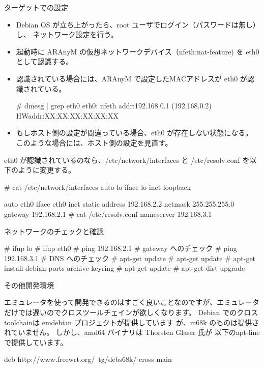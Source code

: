 \begin{frame}[containsverbatim]{ターゲットでの設定}

\begin{itemize}
\item Debian OS が立ち上がったら、root ユーザでログイン（パスワードは無し）し、
ネットワーク設定を行う。
\item 起動時に ARAnyM の仮想ネットワークデバイス（nfeth:nat-feature) を
eth0 として認識する。
\item 認識されている場合には、ARAnyM で設定したMACアドレスが eth0 が認識されている。

\begin{commandline}
# dmesg  | grep eth0
eth0: nfeth addr:192.168.0.1 (192.168.0.2) HWaddr:XX:XX:XX:XX:XX:XX
\end{commandline}

\item もしホスト側の設定が間違っている場合、eth0 が存在しない状態になる。
このような場合には、ホスト側の設定を見直す。
\end{itemize}

\end{frame}

\begin{frame}[containsverbatim]

eth0 が認識されているのなら、/etc/network/interfaces と /etc/resolv.conf
を以下のように変更する。

\begin{commandline}
# cat /etc/network/interfaces
auto lo
iface lo inet loopback

auto eth0
iface eth0 inet static
address 192.168.2.2
netmask 255.255.255.0
gateway 192.168.2.1
# cat /etc/resolv.conf
nameserver 192.168.3.1
\end{commandline}

\end{frame}

\begin{frame}[containsverbatim]{ネットワークのチェックと確認}

\begin{commandline}
# ifup lo
# ifup eth0
# ping 192.168.2.1 # gateway へのチェック
# ping 192.168.3.1 # DNS へのチェック
# apt-get update   # apt-get update
# apt-get install debian-ports-archive-keyring
# apt-get update
# apt-get dist-upgrade
\end{commandline}

\end{frame}

\begin{frame}[containsverbatim]{その他開発環境}

エミュレータを使って開発できるのはすごく良いことなのですが、エミュレータ
だけでは遅いのでクロスツールチェインが欲しくなります。
Debian でのクロスtoolchainは emdebian プロジェクトが提供しています
が、m68k のものは提供されていません。
しかし、amd64 バイナリは Thorsten Glaser 氏が
以下のapt-line で提供しています。

\begin{commandline}
deb http://www.freewrt.org/~tg/debs68k/ cross main
\end{commandline}

\end{frame}


